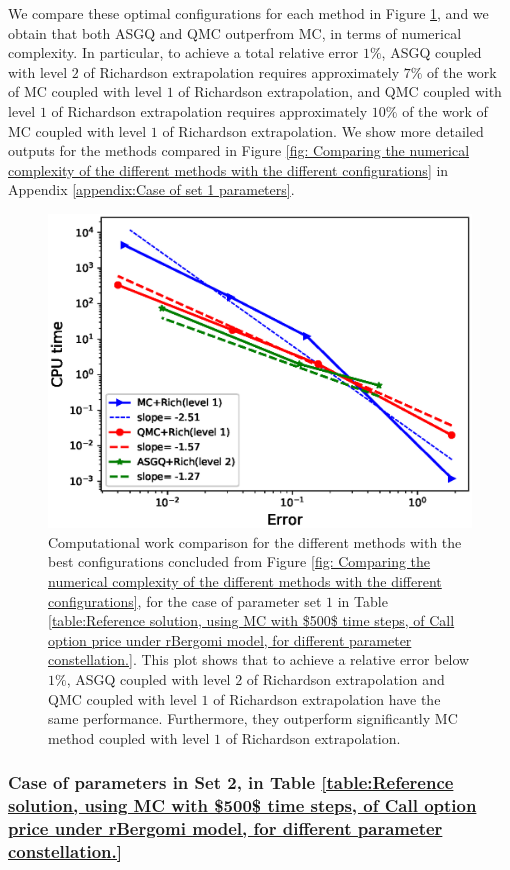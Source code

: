 We compare these optimal configurations for each method  in Figure \ref{fig:Complexity plot for  MISC for Case set $2$ parameters, comparison}, and we obtain that both ASGQ and QMC outperfrom MC, in terms of numerical complexity. In particular, to achieve a total relative error $1\%$, ASGQ coupled with level $2$ of Richardson extrapolation requires
approximately $7\%$ of the work of MC coupled with level $1$ of Richardson extrapolation, and  QMC coupled with level $1$ of Richardson extrapolation requires approximately $10\%$ of the work of MC coupled with level $1$ of Richardson extrapolation. We show more detailed outputs for the methods compared in Figure \ref{fig: Comparing the numerical complexity of the different  methods with the different configurations} in Appendix \ref{appendix:Case of set 1 parameters}.
\FloatBarrier
\begin{figure}[h!]
	\centering
	\includegraphics[width=0.5\linewidth]{./figures/rBergomi_Complexity_rates/set2/error_vs_time_set2_full_comparison}
	
	\caption{Computational work comparison for the different methods with the best configurations concluded from Figure \ref{fig: Comparing the numerical complexity of the different  methods with the different configurations}, for the case of parameter set $1$ in Table \ref{table:Reference solution, using MC with $500$ time steps, of Call option price under rBergomi model, for different parameter constellation.}. This plot shows that to achieve a relative error below $1\%$, ASGQ coupled with level $2$ of Richardson extrapolation and QMC coupled with level $1$ of  Richardson extrapolation have the same performance. Furthermore, they outperform significantly MC method coupled with level $1$ of Richardson extrapolation.}
	\label{fig:Complexity plot for  MISC for Case set $2$ parameters, comparison}
\end{figure}
\FloatBarrier



\subsubsection{Case of parameters in Set 2, in Table \ref{table:Reference solution, using MC with $500$ time steps, of Call option price under rBergomi model, for different parameter constellation.} }\label{sec:Case of set 3 parameters}

